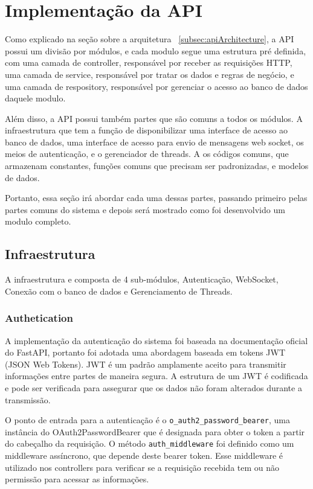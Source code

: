 \section[Implementação da API]{Implementação da API}
Como explicado na seção sobre a arquitetura ~\ref{subsec:apiArchitecture}, a API possui um divisão por módulos, e cada modulo segue uma estrutura pré definida, com uma camada de controller, responsável por receber as requisições HTTP, uma camada de service, responsável por tratar os dados e regras de negócio, e uma camada de respository, responsável por gerenciar o acesso ao banco de dados daquele modulo. 

Além disso, a API possui também partes que são comuns a todos os módulos. A infraestrutura que tem a função de disponibilizar uma interface de acesso ao banco de dados, uma interface de acesso para envio de mensagens web socket, os meios de autenticação, e o gerenciador de threads. A os códigos comuns, que armazenam constantes, funções comuns que precisam ser padronizadas, e modelos de dados.

Portanto, essa seção irá abordar cada uma dessas partes, passando primeiro pelas partes comuns do sistema e depois será mostrado como foi desenvolvido um modulo completo.

\subsection{Infraestrutura}\label{subsec:infra}
A infraestrutura e composta de 4 sub-módulos, Autenticação, WebSocket, Conexão com o banco de dados e Gerenciamento de Threads.

\subsubsection{Authetication}\label{subsubsec:auth}
A implementação da autenticação do sistema foi baseada na documentação oficial do FastAPI, portanto foi adotada uma abordagem baseada em tokens JWT (JSON Web Tokens). JWT é um padrão amplamente aceito para transmitir informações entre partes de maneira segura. A estrutura de um JWT é codificada e pode ser verificada para assegurar que os dados não foram alterados durante a transmissão. 

O ponto de entrada para a autenticação é o \texttt{o\_auth2\_password\_bearer}, uma instância do OAuth2PasswordBearer que é designada para obter o token a partir do cabeçalho da requisição. O método \texttt{auth\_middleware} foi definido como um middleware assíncrono, que depende deste bearer token. Esse middleware é utilizado nos controllers para verificar se a requisição recebida tem ou não permissão para acessar as informações.

